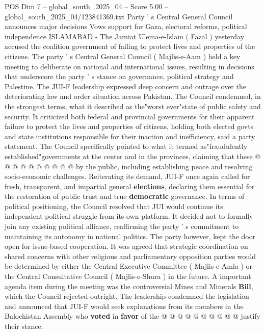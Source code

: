 \begin{textsample}{POS Dim 7 – global\_south\_2025\_04 – Score 5.00 – global\_south\_2025\_04/123841369.txt}  \label{ex:f7_pos_409}
Party ' s Central General Council announces major decisions Vows support for Gaza, electoral reforms, political independence ISLAMABAD - The Jamiat Ulema-e-Islam ( Fazal ) yesterday accused the coalition government of failing to protect lives and properties of the citizens.
The party ' s Central General Council ( Majlis-e-Aam ) held a key meeting to deliberate on national and international issues, resulting in decisions that underscore the party ' s stance on governance, political strategy and Palestine.
The JUI-F leadership expressed deep concern and outrage over the deteriorating law and order situation across Pakistan.
The Council condemned, in the strongest terms, what it described as the"worst ever"state of public safety and security.
It criticized both federal and provincial governments for their apparent failure to protect the lives and properties of citizens, holding both elected govts and state institutions responsible for their inaction and inefficiency, said a party statement.
The Council specifically pointed to what it termed as"fraudulently established"governments at the center and in the provinces, claiming that these @ @ @ @ @ @ @ @ @ @ by the public, including establishing peace and resolving socio-economic challenges.
Reiterating its demand, JUI-F once again called for fresh, transparent, and impartial general \textbf{elections}, declaring them essential for the restoration of public trust and true \textbf{democratic} governance.
In terms of political positioning, the Council resolved that JUI would continue its independent political struggle from its own platform.
It decided not to formally join any existing political alliance, reaffirming the party ' s commitment to maintaining its autonomy in national politics.
The party however, kept the door open for issue-based cooperation.
It was agreed that strategic coordination on shared concerns with other religious and parliamentary opposition parties would be determined by either the Central Executive Committee ( Majlis-e-Amla ) or the Central Consultative Council ( Majlis-e-Shura ) in the future.
A important agenda item during the meeting was the controversial Mines and Minerals \textbf{Bill}, which the Council rejected outright.
The leadership condemned the legislation and announced that JUI-F would seek explanations from its members in the Balochistan Assembly who \textbf{voted} in \textbf{favor} of the @ @ @ @ @ @ @ @ @ @ justify their stance.

\end{textsample}
